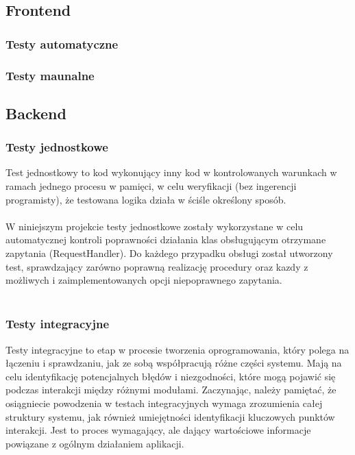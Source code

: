 \documentclass[12pt,a4paper]{article}
\begin{document}
\subsection{Frontend}
\subsubsection{Testy automatyczne}
\subsubsection{Testy maunalne}

\newpage

\subsection{Backend}

\subsubsection{Testy jednostkowe}
Test jednostkowy to kod wykonujący inny kod w kontrolowanych warunkach w ramach jednego procesu w pamięci, w celu weryfikacji (bez ingerencji programisty), że testowana logika działa w ściśle określony sposób.
\\\\
W niniejszym projekcie testy jednostkowe zostały wykorzystane w celu automatycznej kontroli poprawności działania klas obsługującym otrzymane zapytania (RequestHandler). Do każdego przypadku obsługi został utworzony test, sprawdzający zarówno poprawną realizację procedury oraz kazdy z możliwych i zaimplementowanych opcji niepoprawnego zapytania.
\\\\

\subsubsection{Testy integracyjne}
Testy integracyjne to etap w procesie tworzenia oprogramowania, który polega na łączeniu i sprawdzaniu, jak ze sobą współpracują różne części systemu. Mają na celu identyfikację potencjalnych błędów i niezgodności, które mogą pojawić się podczas interakcji między różnymi modułami. Zaczynając, należy pamiętać, że osiągniecie powodzenia w testach integracyjnych wymaga zrozumienia całej struktury systemu, jak również umiejętności identyfikacji kluczowych punktów interakcji. Jest to proces wymagający, ale dający wartościowe informacje powiązane z ogólnym działaniem aplikacji.
\\\\
\end{document}
